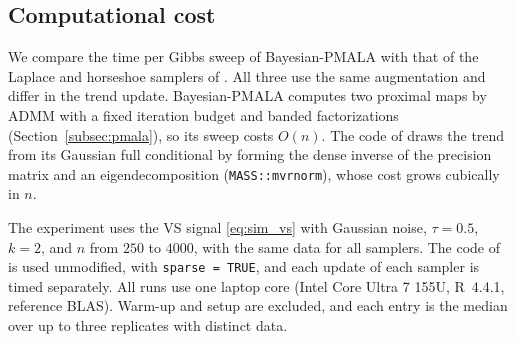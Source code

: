 \subsection{Computational cost}
\label{sec:scalability}


We compare the time per Gibbs sweep of Bayesian-PMALA with that of the Laplace and horseshoe samplers of \citet{onizuka2024fast}. All three use the same augmentation and differ in the trend update. Bayesian-PMALA computes two proximal maps by ADMM with a fixed iteration budget and banded factorizations (Section~\ref{subsec:pmala}), so its sweep costs $O(n)$. The code of \citet{onizuka2024fast} draws the trend from its Gaussian full conditional by forming the dense inverse of the precision matrix and an eigendecomposition (\texttt{MASS::mvrnorm}), whose cost grows cubically in $n$.

The experiment uses the VS signal \eqref{eq:sim_vs} with Gaussian noise, $\tau = 0.5$, $k = 2$, and $n$ from $250$ to $4000$, with the same data for all samplers. The code of \citet{onizuka2024fast} is used unmodified, with \texttt{sparse = TRUE}, and each update of each sampler is timed separately. All runs use one laptop core (Intel Core Ultra 7 155U, R~4.4.1, reference BLAS). Warm-up and setup are excluded, and each entry is the median over up to three replicates with distinct data.

